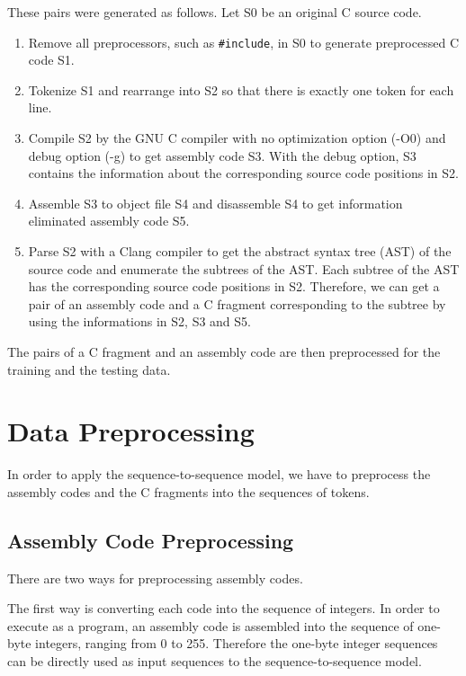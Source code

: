 \documentclass[11pt]{jarticle}
\begin{document}
These pairs were generated as follows. Let S0 be an original C source code.
\begin{enumerate}
\item Remove all preprocessors, such as \texttt{\#include}, in S0 to generate preprocessed C code S1. 
\item Tokenize S1 and rearrange into S2 so that there is exactly one token for each line. 
\item 
Compile S2 by the GNU C compiler with no optimization option (-O0) and debug option (-g) to get assembly code S3. 
With the debug option, S3 contains the information about the corresponding source code positions in S2. 
\item Assemble S3 to object file S4 and disassemble S4 to get information eliminated assembly code S5.
\item 
Parse S2 with a Clang compiler to get the abstract syntax tree (AST) of the source code and enumerate the subtrees of the AST.
Each subtree of the AST has the corresponding source code positions in S2.
Therefore, we can get a pair of an assembly code and a C fragment corresponding to the subtree 
by using the informations in S2, S3 and S5.
\end{enumerate}

The pairs of a C fragment and an assembly code are then preprocessed for the training and the testing data.

\section{Data Preprocessing}

In order to apply the sequence-to-sequence model, 
we have to preprocess the assembly codes and the C fragments into the sequences of tokens.

\subsection{Assembly Code Preprocessing}
There are two ways for preprocessing assembly codes.

The first way is converting each code into the sequence of integers. 
In order to execute as a program, an assembly code is assembled into the sequence of one-byte integers, ranging from 0 to 255.
Therefore the one-byte integer sequences can be directly used as input sequences to the sequence-to-sequence model.
\end{document}
